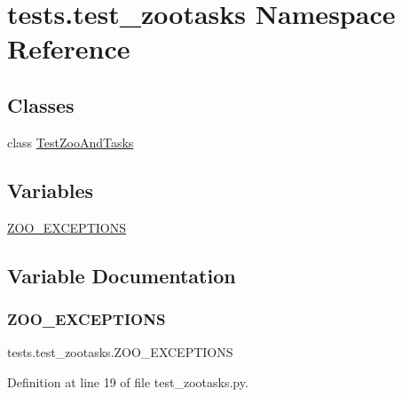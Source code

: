 \hypertarget{namespacetests_1_1test__zootasks}{}\section{tests.\+test\+\_\+zootasks Namespace Reference}
\label{namespacetests_1_1test__zootasks}
\subsection*{Classes}
\begin{DoxyCompactItemize}
\item 
class \hyperlink{classtests_1_1test__zootasks_1_1TestZooAndTasks}{Test\+Zoo\+And\+Tasks}
\end{DoxyCompactItemize}
\subsection*{Variables}
\begin{DoxyCompactItemize}
\item 
\hyperlink{namespacetests_1_1test__zootasks_a9fec5ae6a0868daa67f270a1d057876d}{Z\+O\+O\+\_\+\+E\+X\+C\+E\+P\+T\+I\+O\+NS}
\end{DoxyCompactItemize}


\subsection{Variable Documentation}
\mbox{\label{namespacetests_1_1test__zootasks_a9fec5ae6a0868daa67f270a1d057876d}} 
\subsubsection{\texorpdfstring{Z\+O\+O\+\_\+\+E\+X\+C\+E\+P\+T\+I\+O\+NS}{ZOO\_EXCEPTIONS}}
{\footnotesize\ttfamily tests.\+test\+\_\+zootasks.\+Z\+O\+O\+\_\+\+E\+X\+C\+E\+P\+T\+I\+O\+NS}



Definition at line 19 of file test\+\_\+zootasks.\+py.

